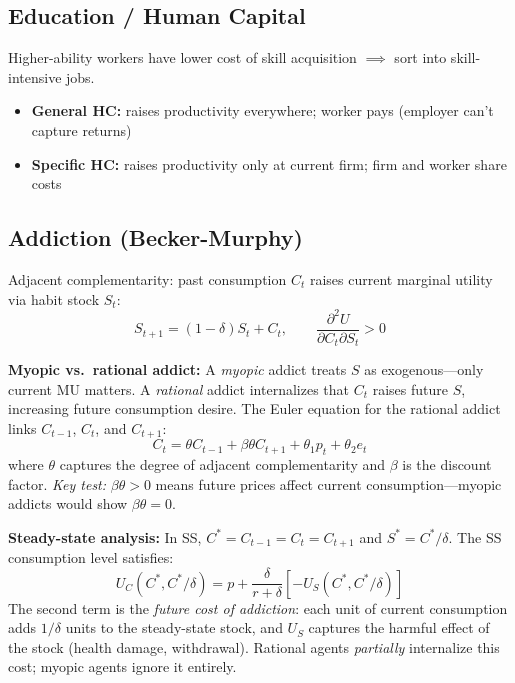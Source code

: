\subsection{Education / Human Capital}
Higher-ability workers have lower cost of skill acquisition $\implies$ sort into skill-intensive jobs.
\begin{itemize}[nosep]
  \item \textbf{General HC:} raises productivity everywhere; worker pays (employer can't capture returns)
  \item \textbf{Specific HC:} raises productivity only at current firm; firm and worker share costs
\end{itemize}

\subsection{Addiction (Becker-Murphy)}
Adjacent complementarity: past consumption $C_t$ raises current marginal utility via habit stock $S_t$:
$$S_{t+1} = (1-\delta)S_t + C_t, \qquad \frac{\partial^2 U}{\partial C_t \partial S_t} > 0$$

\textbf{Myopic vs.\ rational addict:}
A \textit{myopic} addict treats $S$ as exogenous---only current MU matters. A \textit{rational} addict internalizes that $C_t$ raises future $S$, increasing future consumption desire. The Euler equation for the rational addict links $C_{t-1}$, $C_t$, and $C_{t+1}$:
$$C_t = \theta C_{t-1} + \beta\theta C_{t+1} + \theta_1 p_t + \theta_2 e_t$$
where $\theta$ captures the degree of adjacent complementarity and $\beta$ is the discount factor. \textit{Key test:} $\beta\theta > 0$ means future prices affect current consumption---myopic addicts would show $\beta\theta = 0$.

\textbf{Steady-state analysis:}
In SS, $C^* = C_{t-1} = C_t = C_{t+1}$ and $S^* = C^*/\delta$. The SS consumption level satisfies:
$$U_C(C^*, C^*/\delta) = p + \frac{\delta}{r+\delta}\left[-U_S(C^*, C^*/\delta)\right]$$
The second term is the \textit{future cost of addiction}: each unit of current consumption adds $1/\delta$ units to the steady-state stock, and $U_S$ captures the harmful effect of the stock (health damage, withdrawal). Rational agents \textit{partially} internalize this cost; myopic agents ignore it entirely.

